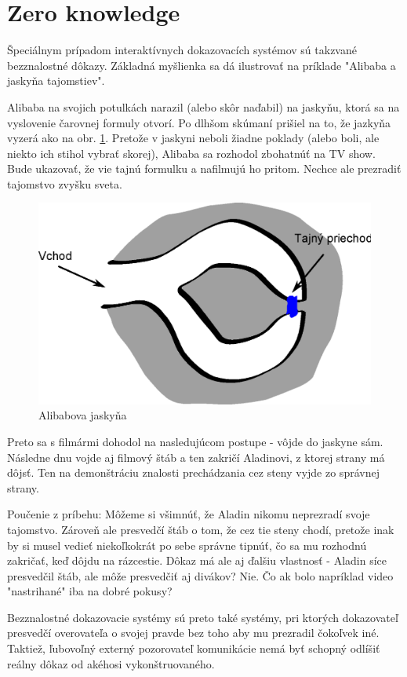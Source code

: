 \section{Zero knowledge}
Špeciálnym prípadom interaktívnych dokazovacích systémov sú takzvané
bezznalostné dôkazy. Základná myšlienka sa dá ilustrovať na príklade 
"Alibaba a jaskyňa tajomstiev".

Alibaba na svojich potulkách narazil (alebo skôr naďabil) na jaskyňu,
ktorá sa na vyslovenie čarovnej formuly otvorí. Po dlhšom skúmaní
prišiel na to, že jazkyňa vyzerá ako na obr. \ref{fig:alibaba}. Pretože v
jaskyni neboli žiadne poklady (alebo boli, ale niekto ich stihol
vybrať skorej), Alibaba sa rozhodol zbohatnúť na TV show.
Bude ukazovať, že vie tajnú formulku a nafilmujú ho pritom. Nechce ale
prezradiť tajomstvo zvyšku sveta.

\begin{figure}[htp]
    \centering
    \includegraphics[scale=0.4]{img/x/alibaba}
    
    \label{fig:alibaba}
    \caption{Alibabova jaskyňa}
\end{figure}

Preto sa s filmármi dohodol na nasledujúcom postupe - vôjde do jaskyne
sám. Následne dnu vojde aj filmový štáb a ten zakričí Aladinovi, z
ktorej strany má dôjsť. Ten na demonštráciu znalosti prechádzania cez
steny vyjde zo správnej strany.

Poučenie z príbehu: Môžeme si všimnúť, že Aladin nikomu neprezradí
svoje tajomstvo. Zároveň ale presvedčí štáb o tom, že cez tie steny
chodí, pretože inak by si musel vedieť niekoľkokrát po sebe správne
tipnúť, čo sa mu rozhodnú zakričať, keď dôjdu na rázcestie.
Dôkaz má ale aj ďalšiu vlastnosť - Aladin síce presvedčil štáb, ale
môže presvedčiť aj divákov? Nie. Čo ak bolo napríklad video
"nastrihané" iba na dobré pokusy?

Bezznalostné dokazovacie systémy sú preto také systémy, pri ktorých
dokazovateľ presvedčí overovateľa o svojej pravde bez toho aby mu
prezradil čokoľvek iné. Taktiež, ľubovoľný externý pozorovateľ
komunikácie nemá byť schopný odlíšiť reálny dôkaz od akéhosi
vykonštruovaného.


